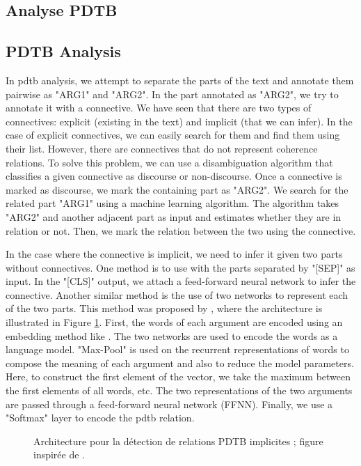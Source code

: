 \documentclass{KBook}
\begin{document}
\subsection{Analyse PDTB}

\subsection{PDTB Analysis}

In \ac{pdtb} analysis, we attempt to separate the parts of the text and annotate them pairwise as "ARG1" and "ARG2". In the part annotated as "ARG2", we try to annotate it with a connective. We have seen that there are two types of connectives: explicit (existing in the text) and implicit (that we can infer). In the case of explicit connectives, we can easily search for them and find them using their list. However, there are connectives that do not represent coherence relations. To solve this problem, we can use a disambiguation algorithm that classifies a given connective as discourse or non-discourse. Once a connective is marked as discourse, we mark the containing part as "ARG2". We search for the related part "ARG1" using a machine learning algorithm. The algorithm takes "ARG2" and another adjacent part as input and estimates whether they are in relation or not. Then, we mark the relation between the two using the connective.

In the case where the connective is implicit, we need to infer it given two parts without connectives. One method is to use  with the parts separated by "[SEP]" as input. In the "[CLS]" output, we attach a feed-forward neural network to infer the connective. Another similar method is the use of two  networks to represent each of the two parts. This method was proposed by \citet{2020-liang-al}, where the architecture is illustrated in Figure \ref{fig:pdtb-liang}. First, the words of each argument are encoded using an embedding method like . The two  networks are used to encode the words as a language model. "Max-Pool" is used on the recurrent representations of words to compose the meaning of each argument and also to reduce the model parameters. Here, to construct the first element of the vector, we take the maximum between the first elements of all words, etc. The two representations of the two arguments are passed through a feed-forward neural network (FFNN). Finally, we use a "Softmax" layer to encode the \ac{pdtb} relation.
\begin{figure}[ht]
	\centering
	\caption[Architecture pour la détection de relations PDTB implicites]{Architecture pour la détection de relations PDTB implicites ; figure inspirée de \cite{2020-liang-al}.}
	\label{fig:pdtb-liang}
\end{figure}
\end{document}
